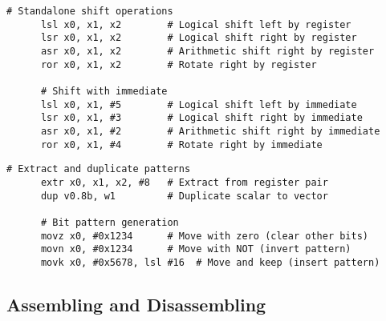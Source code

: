   \begin{definition}
    \begin{lstlisting}[language=arm]
      # Standalone shift operations
      lsl x0, x1, x2        # Logical shift left by register
      lsr x0, x1, x2        # Logical shift right by register
      asr x0, x1, x2        # Arithmetic shift right by register
      ror x0, x1, x2        # Rotate right by register
      
      # Shift with immediate
      lsl x0, x1, #5        # Logical shift left by immediate
      lsr x0, x1, #3        # Logical shift right by immediate
      asr x0, x1, #2        # Arithmetic shift right by immediate
      ror x0, x1, #4        # Rotate right by immediate
    \end{lstlisting}
  \end{definition}

  \begin{definition}
    \begin{lstlisting}[language=arm]
      # Extract and duplicate patterns
      extr x0, x1, x2, #8   # Extract from register pair
      dup v0.8b, w1         # Duplicate scalar to vector
      
      # Bit pattern generation
      movz x0, #0x1234      # Move with zero (clear other bits)
      movn x0, #0x1234      # Move with NOT (invert pattern)
      movk x0, #0x5678, lsl #16  # Move and keep (insert pattern)
    \end{lstlisting}
  \end{definition}

\subsection{Assembling and Disassembling} 

